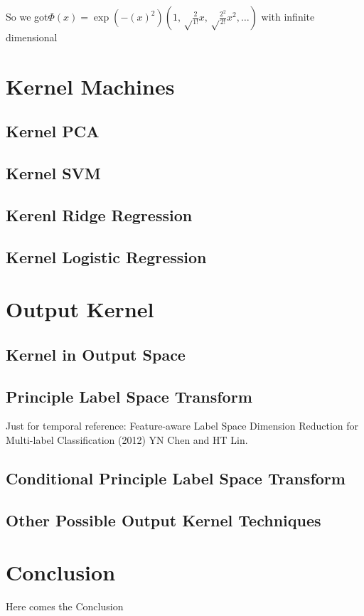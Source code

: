 \documentclass[12pt]{article}
\theoremstyle{definition}
\theoremstyle{remark}
\begin{document}
So we got\(\Phi(x) = \exp(-{(x)}^{2})(1, \sqrt\frac{2}{1!}x, \sqrt\frac{2^{2}}{2!}x^{2}, \dots)\) with infinite dimensional

\section{Kernel Machines}
\subsection{Kernel PCA}
\subsection{Kernel SVM}
\subsection{Kerenl Ridge Regression}
\subsection{Kernel Logistic Regression}

\section{Output Kernel}
\subsection{Kernel in Output Space}
\subsection{Principle Label Space Transform}
Just for temporal reference: Feature-aware Label Space Dimension Reduction for Multi-label Classification (2012) YN Chen and HT Lin.
\subsection{Conditional Principle Label Space Transform}
\subsection{Other Possible Output Kernel Techniques}

\section{Conclusion}
Here comes the Conclusion






\end{document}
